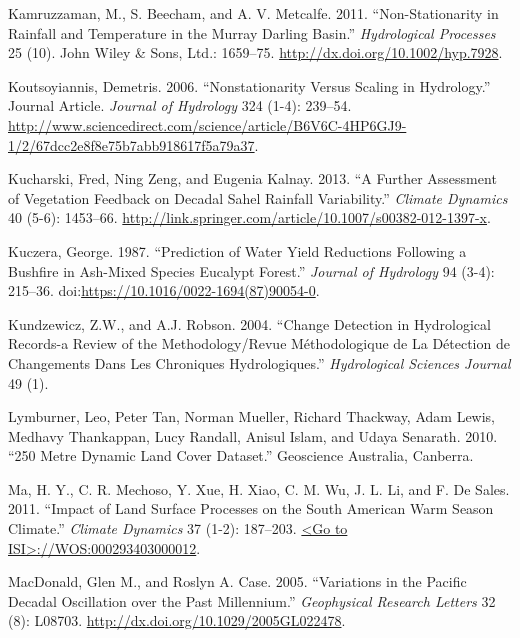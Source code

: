 \documentclass[]{elsarticle} %
\theoremstyle{definition}
\theoremstyle{definition}
\theoremstyle{definition}
\theoremstyle{remark}
\begin{document}
\hypertarget{ref-Kamruzzaman2011}{}
Kamruzzaman, M., S. Beecham, and A. V. Metcalfe. 2011.
``Non-Stationarity in Rainfall and Temperature in the Murray Darling
Basin.'' \emph{Hydrological Processes} 25 (10). John Wiley \& Sons,
Ltd.: 1659--75. \url{http://dx.doi.org/10.1002/hyp.7928}.

\hypertarget{ref-Koutsoyiannis2007}{}
Koutsoyiannis, Demetris. 2006. ``Nonstationarity Versus Scaling in
Hydrology.'' Journal Article. \emph{Journal of Hydrology} 324 (1-4):
239--54.
\href{http://www.sciencedirect.com/science/article/B6V6C-4HP6GJ9-1/2/67dcc2e8f8e75b7abb918617f5a79a37\%20}{http://www.sciencedirect.com/science/article/B6V6C-4HP6GJ9-1/2/67dcc2e8f8e75b7abb918617f5a79a37}.

\hypertarget{ref-kucharski_further_2013}{}
Kucharski, Fred, Ning Zeng, and Eugenia Kalnay. 2013. ``A Further
Assessment of Vegetation Feedback on Decadal Sahel Rainfall
Variability.'' \emph{Climate Dynamics} 40 (5-6): 1453--66.
\url{http://link.springer.com/article/10.1007/s00382-012-1397-x}.

\hypertarget{ref-Kuzcera1987}{}
Kuczera, George. 1987. ``Prediction of Water Yield Reductions Following
a Bushfire in Ash-Mixed Species Eucalypt Forest.'' \emph{Journal of
Hydrology} 94 (3-4): 215--36.
doi:\href{https://doi.org/https://10.1016/0022-1694(87)90054-0}{https://10.1016/0022-1694(87)90054-0}.

\hypertarget{ref-Kundzewicz2004}{}
Kundzewicz, Z.W., and A.J. Robson. 2004. ``Change Detection in
Hydrological Records-a Review of the Methodology/Revue Méthodologique de
La Détection de Changements Dans Les Chroniques Hydrologiques.''
\emph{Hydrological Sciences Journal} 49 (1).

\hypertarget{ref-Lymburner2010}{}
Lymburner, Leo, Peter Tan, Norman Mueller, Richard Thackway, Adam Lewis,
Medhavy Thankappan, Lucy Randall, Anisul Islam, and Udaya Senarath.
2010. ``250 Metre Dynamic Land Cover Dataset.'' Geoscience Australia,
Canberra.

\hypertarget{ref-Ma2011}{}
Ma, H. Y., C. R. Mechoso, Y. Xue, H. Xiao, C. M. Wu, J. L. Li, and F. De
Sales. 2011. ``Impact of Land Surface Processes on the South American
Warm Season Climate.'' \emph{Climate Dynamics} 37 (1-2): 187--203.
\href{\%3CGo\%20to\%20ISI\%3E://WOS:000293403000012}{\textless{}Go to ISI\textgreater{}://WOS:000293403000012}.

\hypertarget{ref-MacDonald2005}{}
MacDonald, Glen M., and Roslyn A. Case. 2005. ``Variations in the
Pacific Decadal Oscillation over the Past Millennium.''
\emph{Geophysical Research Letters} 32 (8): L08703.
\url{http://dx.doi.org/10.1029/2005GL022478}.
\end{document}
